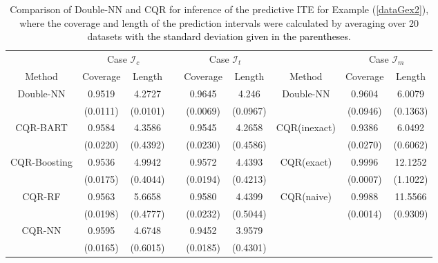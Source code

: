 \documentclass[11pt]{article}
\begin{document}
\begin{table}[!h]
\caption{
Comparison of Double-NN and CQR for inference of the predictive 
ITE for Example (\ref{dataGex2}), where the coverage and length of the prediction intervals were calculated by averaging over 20 datasets \textcolor{black}{with the standard deviation given in the parentheses.}}
\vspace{-0.15in}
\label{case2compar}
\begin{center}
\begin{adjustbox}{width=1.0\textwidth}
\begin{tabular}{ccccccccc} \toprule
     & \multicolumn{2}{c}{Case $\mathcal{I}_c$} & & \multicolumn{2}{c}{Case $\mathcal{I}_t$} 
     &  & \multicolumn{2}{c}{Case $\mathcal{I}_m$}\\ \cline{2-3} \cline{5-6} \cline{8-9}
 Method &  Coverage & Length & & Coverage & Length & Method & Coverage & Length \\ \midrule
 \multirow{2}{*}{Double-NN}  & 0.9519 & 4.2727 & & 0.9645 & 4.246 & \multirow{2}{*}{Double-NN}  & 0.9604 & 6.0079 \\
 & (0.0111) & (0.0101) & & (0.0069) & (0.0967) &  & (0.0946) &  (0.1363)\\
  \multirow{2}{*}{CQR-BART} & 0.9584 & 4.3586 & &  0.9545 & 4.2658 & \multirow{2}{*}{CQR(inexact)} & 0.9386 & 6.0492 \\
    & (0.0220) & (0.4392) & & (0.0230) & (0.4586) & & (0.0270) & (0.6062)\\
  \multirow{2}{*}{CQR-Boosting} & 0.9536 & 4.9942 &&  0.9572 & 4.4393 & \multirow{2}{*}{CQR(exact)} & 0.9996 & 12.1252\\
    &  (0.0175) & (0.4044) &&  (0.0194) & (0.4213) &  & (0.0007) & (1.1022) \\
  \multirow{2}{*}{CQR-RF} &  0.9563 & 5.6658 &&  0.9580 & 4.4399 & \multirow{2}{*}{CQR(naive)} &  0.9988 & 11.5566 \\
  &  (0.0198) & (0.4777) &&  (0.0232) & (0.5044) &  &  (0.0014) & (0.9309) \\
    \multirow{2}{*}{CQR-NN} &  0.9595 & 4.6748 &&  0.9452 & 3.9579 & \\
  &  (0.0165) & (0.6015) &&  (0.0185) &  (0.4301) & \\
  \bottomrule
\end{tabular}
\end{adjustbox}
\end{center}
\end{table}
\end{document}

